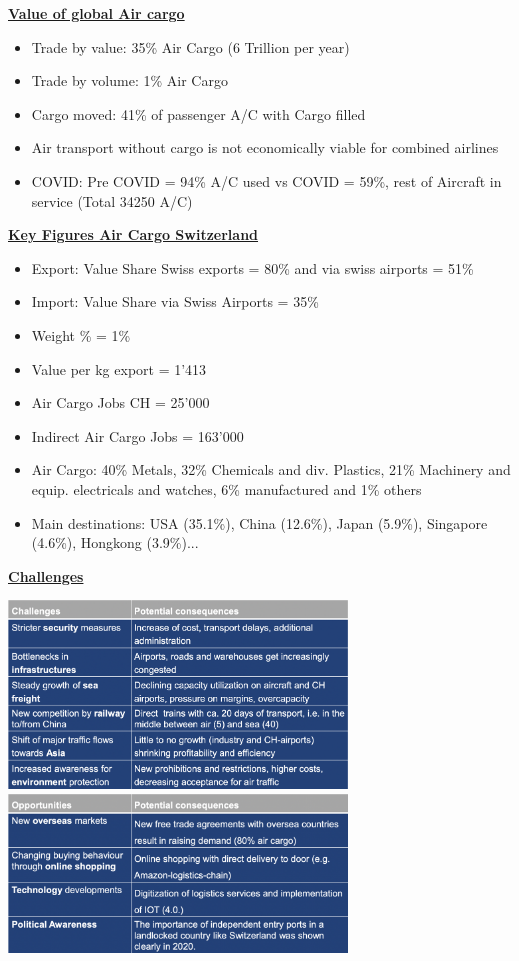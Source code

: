 \documentclass[9pt, landscape, fleqn]{scrartcl}
\begin{document}
\begin{multicols*}{3}
\begin{itemize}
\begin{itemize}
    \end{itemize}
\end{itemize}
\underline{\textbf{Value of global Air cargo}}
\begin{itemize}
    \item Trade by value: 35\% Air Cargo (6 Trillion per year)
    \item Trade by volume: 1\% Air Cargo 
    \item Cargo moved: 41\% of passenger A/C with Cargo filled 
    \item Air transport without cargo is not economically viable for combined airlines 
    \item COVID: Pre COVID = 94\% A/C used vs COVID = 59\%, rest of Aircraft in service (Total 34250 A/C)
\end{itemize}
\underline{\textbf{Key Figures Air Cargo Switzerland}}
\begin{itemize}
    \item Export: Value Share Swiss exports = 80\% and via swiss airports = 51\% 
    \item Import: Value Share via Swiss Airports = 35\% 
    \item Weight \% = 1\% 
    \item Value per kg export = 1'413
    \item Air Cargo Jobs CH = 25'000
    \item Indirect Air Cargo Jobs = 163'000
    \item Air Cargo: 40\% Metals, 32\% Chemicals and div. Plastics, 21\% Machinery and equip. electricals and watches, 6\% manufactured and 1\% others 
    \item Main destinations: USA (35.1\%), China (12.6\%), Japan (5.9\%), Singapore (4.6\%), Hongkong (3.9\%)... 
\end{itemize}
\underline{\textbf{Challenges}}
\begin{center}
    \includegraphics[width=9cm]{Images/Challenges_1.png}
    \includegraphics[width=9cm]{Images/Challenges_2.png}

\end{center}
\end{multicols*}
\end{document}
